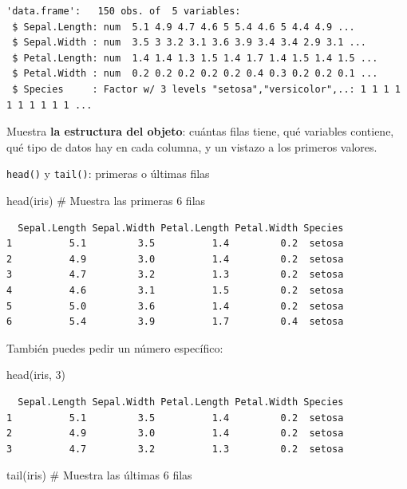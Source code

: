\documentclass[
  letterpaper,
  DIV=11,
  numbers=noendperiod,
  twoside]{scrreprt}
\newenvironment{Shaded}{\begin{snugshade}}{\end{snugshade}}
\newcommand{\CommentTok}[1]{\textcolor[rgb]{0.37,0.37,0.37}{#1}}
\newcommand{\DecValTok}[1]{\textcolor[rgb]{0.68,0.00,0.00}{#1}}
\newcommand{\FunctionTok}[1]{\textcolor[rgb]{0.28,0.35,0.67}{#1}}
\newcommand{\NormalTok}[1]{\textcolor[rgb]{0.00,0.23,0.31}{#1}}
\begin{document}
\begin{verbatim}
'data.frame':   150 obs. of  5 variables:
 $ Sepal.Length: num  5.1 4.9 4.7 4.6 5 5.4 4.6 5 4.4 4.9 ...
 $ Sepal.Width : num  3.5 3 3.2 3.1 3.6 3.9 3.4 3.4 2.9 3.1 ...
 $ Petal.Length: num  1.4 1.4 1.3 1.5 1.4 1.7 1.4 1.5 1.4 1.5 ...
 $ Petal.Width : num  0.2 0.2 0.2 0.2 0.2 0.4 0.3 0.2 0.2 0.1 ...
 $ Species     : Factor w/ 3 levels "setosa","versicolor",..: 1 1 1 1 1 1 1 1 1 1 ...
\end{verbatim}

Muestra \textbf{la estructura del objeto}: cuántas filas tiene, qué
variables contiene, qué tipo de datos hay en cada columna, y un vistazo
a los primeros valores.

\texttt{head()} y \texttt{tail()}: primeras o últimas filas

\begin{Shaded}
\begin{Highlighting}[]
\FunctionTok{head}\NormalTok{(iris)   }\CommentTok{\# Muestra las primeras 6 filas}
\end{Highlighting}
\end{Shaded}

\begin{verbatim}
  Sepal.Length Sepal.Width Petal.Length Petal.Width Species
1          5.1         3.5          1.4         0.2  setosa
2          4.9         3.0          1.4         0.2  setosa
3          4.7         3.2          1.3         0.2  setosa
4          4.6         3.1          1.5         0.2  setosa
5          5.0         3.6          1.4         0.2  setosa
6          5.4         3.9          1.7         0.4  setosa
\end{verbatim}

También puedes pedir un número específico:

\begin{Shaded}
\begin{Highlighting}[]
\FunctionTok{head}\NormalTok{(iris, }\DecValTok{3}\NormalTok{)}
\end{Highlighting}
\end{Shaded}

\begin{verbatim}
  Sepal.Length Sepal.Width Petal.Length Petal.Width Species
1          5.1         3.5          1.4         0.2  setosa
2          4.9         3.0          1.4         0.2  setosa
3          4.7         3.2          1.3         0.2  setosa
\end{verbatim}

\begin{Shaded}
\begin{Highlighting}[]
\FunctionTok{tail}\NormalTok{(iris)   }\CommentTok{\# Muestra las últimas 6 filas}
\end{Highlighting}
\end{Shaded}
\end{document}
